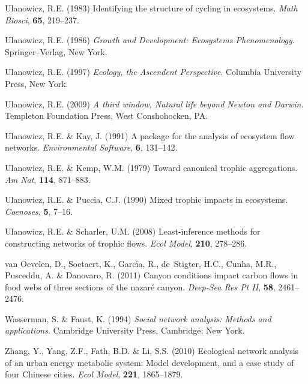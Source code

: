 \documentclass[11pt]{article}
\begin{document}
\begin{thebibliography}{79}
Ulanowicz, R.E. (1983) Identifying the structure of cycling in ecosystems.
\newblock \emph{Math Biosci}, \textbf{65}, 219--237.

Ulanowicz, R.E. (1986) \emph{Growth and Development: Ecosystems Phenomenology}.
\newblock Springer--Verlag, New York.

Ulanowicz, R.E. (1997) \emph{Ecology, the Ascendent Perspective}.
\newblock Columbia University Press, New York.

Ulanowicz, R.E. (2009) \emph{A third window, {N}atural life beyond {N}ewton and
  {D}arwin}.
\newblock Templeton Foundation Press, West Conshohocken, PA.

Ulanowicz, R.E. \& Kay, J. (1991) A package for the analysis of ecosystem flow
  networks.
\newblock \emph{Environmental Software}, \textbf{6}, 131--142.

Ulanowicz, R.E. \& Kemp, W.M. (1979) Toward canonical trophic aggregations.
\newblock \emph{Am Nat}, \textbf{114}, 871--883.

Ulanowicz, R.E. \& Puccia, C.J. (1990) Mixed trophic impacts in ecosystems.
\newblock \emph{Coenoses}, \textbf{5}, 7--16.

Ulanowicz, R.E. \& Scharler, U.M. (2008) Least-inference methods for
  constructing networks of trophic flows.
\newblock \emph{Ecol Model}, \textbf{210}, 278--286.

van Oevelen, D., Soetaert, K., Garc{\'\i}a, R., de~Stigter, H.C., Cunha, M.R.,
  Pusceddu, A. \& Danovaro, R. (2011) Canyon conditions impact carbon flows in
  food webs of three sections of the nazar{\'e} canyon.
\newblock \emph{Deep-Sea Res Pt II}, \textbf{58}, 2461--2476.

Wasserman, S. \& Faust, K. (1994) \emph{Social network analysis: {M}ethods and
  applications}.
\newblock Cambridge University Press, Cambridge; New York.

Zhang, Y., Yang, Z.F., Fath, B.D. \& Li, S.S. (2010) Ecological network
  analysis of an urban energy metabolic system: Model development, and a case
  study of four {C}hinese cities.
\newblock \emph{Ecol Model}, \textbf{221}, 1865--1879.

\end{thebibliography}
\end{document}
